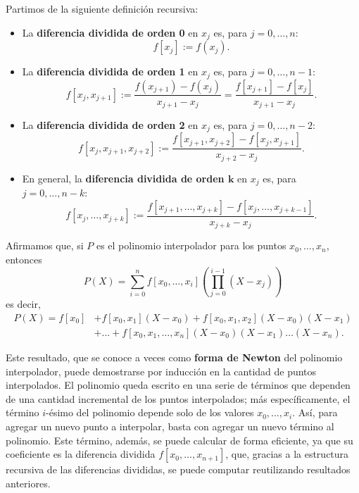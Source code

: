 Partimos de la siguiente definición recursiva:
\begin{itemize}
\item La \textbf{diferencia dividida de orden 0} en $x_j$ es, para $j = 0,
    \dots, n$:
    \[f[x_j] := f(x_j).\]
\item La \textbf{diferencia dividida de orden 1} en $x_j$ es, para $j = 0,
    \dots, n-1$:
    \[f[x_j,x_{j+1}]
        := \frac{f(x_{j+1}) - f(x_j)}{x_{j+1} - x_j}
        = \frac{f[x_{j+1}] - f[x_j]}{x_{j+1} - x_j}.\]
\item La \textbf{diferencia dividida de orden 2} en $x_j$ es, para $j = 0,
    \dots, n-2$:
    \[f[x_j,x_{j+1},x_{j+2}]
        := \frac{f[x_{j+1},x_{j+2}] - f[x_j,x_{j+1}]}{x_{j+2} - x_j}.\]
\item En general, la \textbf{diferencia dividida de orden $\bm{k}$} en $x_j$
    es, para $j = 0, \dots, n-k$:
    \[f[x_j,\dots,x_{j+k}]
        := \frac{f[x_{j+1},\dots,x_{j+k}] - f[x_j,\dots,x_{j+k-1}]}{x_{j+k} - x_j}.\]
\end{itemize}

Afirmamos que, si $P$ es el polinomio interpolador para los puntos $x_0,
\dots, x_n$, entonces
\[ P(X) = \sum_{i=0}^n f[x_0,\dots,x_i]
    \left( \prod_{j=0}^{i-1} (X - x_j) \right) \]
es decir,
\[ \begin{aligned}
P(X) = f[x_0] &+ f[x_0,x_1] (X - x_0) + f[x_0,x_1,x_2] (X - x_0) (X - x_1) \\
       &+ \dots + f[x_0,x_1,\dots,x_n] (X - x_0) (X - x_1) \dots (X - x_n).
\end{aligned} \]

Este resultado, que se conoce a veces como \textbf{forma de Newton} del
polinomio interpolador, puede demostrarse por inducción en la cantidad de
puntos interpolados. El polinomio queda escrito en una serie de términos que
dependen de una cantidad incremental de los puntos interpolados; más
específicamente, el término $i$-ésimo del polinomio depende solo de los
valores $x_0,\dots,x_i$. Así, para agregar un nuevo punto a interpolar, basta
con agregar un nuevo término al polinomio. Este término, además, se puede
calcular de forma eficiente, ya que su coeficiente es la
diferencia dividida $f[x_0, \dots, x_{n+1}]$, que, gracias a la estructura
recursiva de las diferencias divididas, se puede computar reutilizando
resultados anteriores.

